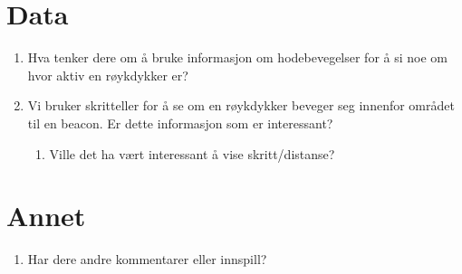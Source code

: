 \documentclass[../Main/thesis.tex]{subfiles}
\begin{document}
\section*{Data}
\begin{enumerate}
	\item Hva tenker dere om å bruke informasjon om hodebevegelser for å si noe om hvor aktiv en røykdykker er?
	\item Vi bruker skritteller for å se om en røykdykker beveger seg innenfor området til en beacon. Er dette informasjon som er interessant?
\begin{enumerate}
	\item Ville det ha vært interessant å vise skritt/distanse?
\end{enumerate}
\end{enumerate}

\section*{Annet}
\begin{enumerate}
	\item Har dere andre kommentarer eller innspill?
\end{enumerate}
\end{document}
